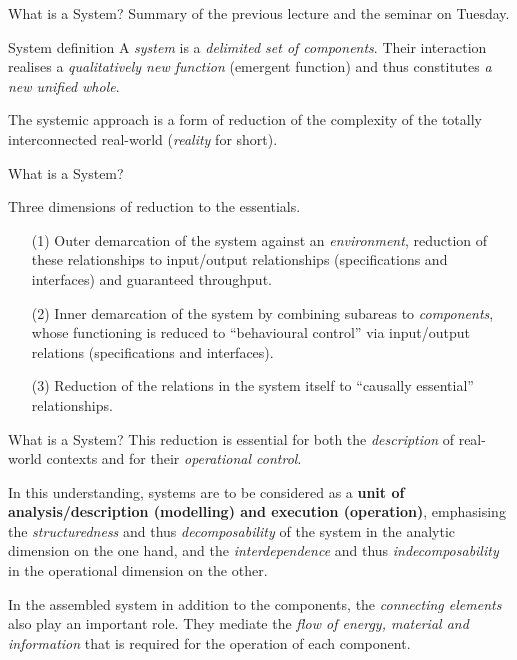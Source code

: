 \documentclass{beamer}
\title{Modelling Sustainable Systems\\ and Semantic Web\\[6pt]
  Systems and their Development
  \vskip1em}
\subtitle{Lecture in the Module 10-202-2309\\ for Master Computer Science}
\author{Prof. Dr. Hans-Gert Gräbe\\
\url{http://www.informatik.uni-leipzig.de/~graebe}}
\date{October 2021}
\begin{document}
{
\begin{frame}
  \titlepage
\end{frame}}

\begin{frame}{What is a System?}
Summary of the previous lecture and the seminar on Tuesday.

  \begin{block}{System definition}
    A \emph{system} is a \emph{delimited set of components}.  Their
    interaction realises a \emph{qualitatively new function} (emergent
    function) and thus constitutes \emph{a new unified whole}.
  \end{block}

The systemic approach is a form of reduction of the complexity of the totally
interconnected real-world (\emph{reality} for short).
\end{frame}

\begin{frame}{What is a System?}
  \begin{block}{Three dimensions of reduction to the essentials.}
    \begin{itemize}
    \item[(1)] Outer demarcation of the system against an \emph{environment},
      reduction of these relationships to input/output relationships
      (specifications and interfaces) and guaranteed throughput.
    \item[(2)] Inner demarcation of the system by combining subareas to
      \emph{components}, whose functioning is reduced to “behavioural control”
      via input/output relations (specifications and interfaces).
    \item[(3)] Reduction of the relations in the system itself to “causally
      essential” relationships.
    \end{itemize}
  \end{block}
\end{frame}

\begin{frame}{What is a System?}
This reduction is essential for both the \emph{description} of real-world
contexts and for their \emph{operational control}.

In this understanding, systems are to be considered as a \textbf{unit of
  analysis/description (modelling) and execution (operation)}, emphasising the
\emph{structuredness} and thus \emph{decomposability} of the system in the
analytic dimension on the one hand, and the \emph{interdependence} and thus
\emph{indecomposability} in the operational dimension on the other.

In the assembled system in addition to the components, the \emph{connecting
  elements} also play an important role.  They mediate the \emph{flow of
  energy, material and information} that is required for the operation of each
component.
\end{frame}
\end{document}
